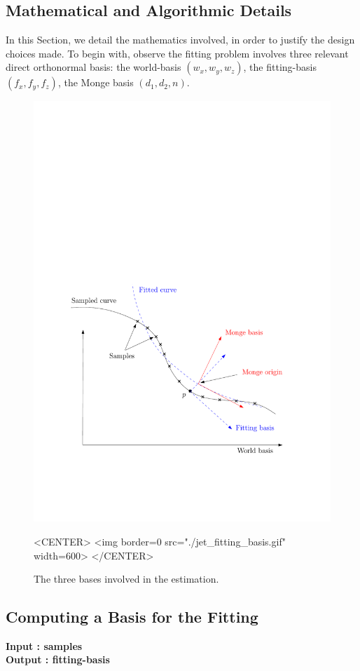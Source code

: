  \begin{ccAdvanced} 
\section{Mathematical and Algorithmic Details}
\label{sec:details}
In this Section, we detail the mathematics involved, in order to
justify the design choices made.
To begin with, observe the fitting problem involves three relevant
direct orthonormal basis: the world-basis $(w_x,w_y,w_z)$, the
fitting-basis $(f_x,f_y,f_z)$, the Monge basis $(d_1,d_2,n)$.

\begin{figure}[!ht]
\begin{ccTexOnly}
\centerline{
\includegraphics[width=.5\linewidth]{Jet_fitting_3/jet_fitting_basis}}
\end{ccTexOnly}

\label{fig:jet_fitting_basis}

\begin{ccHtmlOnly}
<CENTER>
<img border=0 src="./jet_fitting_basis.gif" width=600>
</CENTER>
\end{ccHtmlOnly}
\caption{The three bases involved in the estimation.}
\end{figure}

\subsection{Computing a Basis for the Fitting}

{\bf Input : samples\\ Output : fitting-basis}



\end{ccAdvanced}
